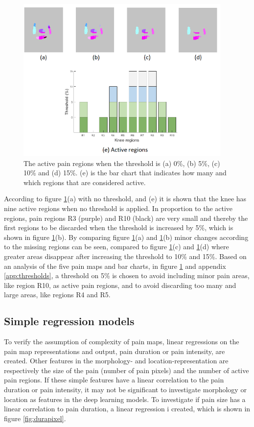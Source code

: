 \begin{figure} [H]
\centering
\includegraphics[width=0.95\textwidth]{figures/threshold4}
\caption{The active pain regions when the threshold is (a) 0\%, (b) 5\%, (c) 10\% and (d) 15\%. (e) is the bar chart that indicates how many and which regions that are considered active.}
\label{fig:threshold}
\end{figure}

\noindent
According to figure \ref{fig:threshold}(a) with no threshold, and (e) it is shown that the knee has nine active regions when no threshold is applied. In proportion to the active regions, pain regions R3 (purple) and R10 (black) are very small and thereby the first regions to be discarded when the threshold is increased by 5\%, which is shown in figure \ref{fig:threshold}(b).
By comparing figure \ref{fig:threshold}(a) and \ref{fig:threshold}(b) minor changes according to the missing regions can be seen, compared to figure \ref{fig:threshold}(c) and \ref{fig:threshold}(d) where greater areas disappear after increasing the threshold to 10\% and 15\%.
\noindent
Based on an analysis of the five pain maps and bar charts, in figure \ref{fig:threshold} and appendix \ref{app:thresholds}, a threshold on 5\% is chosen to avoid including minor pain areas, like region R10, as active pain regions, and to avoid discarding too many and large areas, like regions R4 and R5.


\subsection{Simple regression models}
To verify the assumption of complexity of pain maps, linear regressions on the pain map representations and output, pain duration or pain intensity, are created. 
Other features in the morphology- and location-representation are respectively the size of the pain (number of pain pixels) and the number of active pain regions. If these simple features have a linear correlation to the pain duration or pain intensity,  it may not be significant to investigate morphology or location as features in the deep learning models. \newline
\noindent
To investigate if pain size has a linear correlation to pain duration, a linear regression i created, which is shown in figure \ref{fig:durapixel}.
\newline

